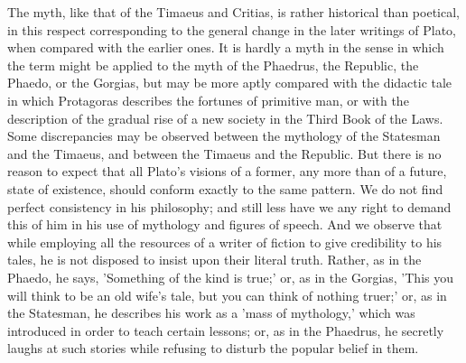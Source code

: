 \documentclass[11pt,letter]{article}
\begin{document}
\par  The myth, like that of the Timaeus and Critias, is rather historical than poetical, in this respect corresponding to the general change in the later writings of Plato, when compared with the earlier ones. It is hardly a myth in the sense in which the term might be applied to the myth of the Phaedrus, the Republic, the Phaedo, or the Gorgias, but may be more aptly compared with the didactic tale in which Protagoras describes the fortunes of primitive man, or with the description of the gradual rise of a new society in the Third Book of the Laws. Some discrepancies may be observed between the mythology of the Statesman and the Timaeus, and between the Timaeus and the Republic. But there is no reason to expect that all Plato's visions of a former, any more than of a future, state of existence, should conform exactly to the same pattern. We do not find perfect consistency in his philosophy; and still less have we any right to demand this of him in his use of mythology and figures of speech. And we observe that while employing all the resources of a writer of fiction to give credibility to his tales, he is not disposed to insist upon their literal truth. Rather, as in the Phaedo, he says, 'Something of the kind is true;' or, as in the Gorgias, 'This you will think to be an old wife's tale, but you can think of nothing truer;' or, as in the Statesman, he describes his work as a 'mass of mythology,' which was introduced in order to teach certain lessons; or, as in the Phaedrus, he secretly laughs at such stories while refusing to disturb the popular belief in them.
\end{document}

